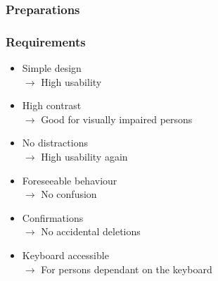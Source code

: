 \documentclass[9pt]{beamer}
\begin{document}
		\begin{frame}
			\frametitle{Preparations}
			\begin{figure}
				\centering
			\end{figure}
		\end{frame}
		
		\begin{frame}
			\frametitle{Requirements}
			\begin{itemize}[<+->]
				\item Simple design\\
				$\rightarrow$ High usability
				\item High contrast\\
				$\rightarrow$ Good for visually impaired persons
				\item No distractions\\
				$\rightarrow$ High usability again
				\item Foreseeable behaviour\\
				$\rightarrow$ No confusion
				\item Confirmations\\
				$\rightarrow$ No accidental deletions
				\item Keyboard accessible\\
				$\rightarrow$ For persons dependant on the keyboard
			\end{itemize}
		\end{frame}
	
\end{document}
